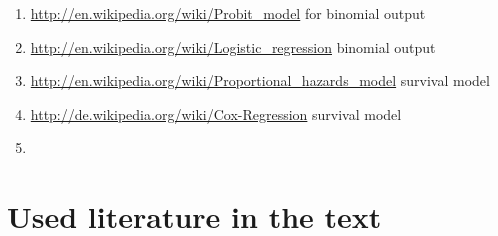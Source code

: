 \documentclass{article}
\begin{document}
\begin{enumerate}
		\begin{enumerate}
			\item \textcolor{black}{\url{http://en.wikipedia.org/wiki/Probit_model}} for binomial output
			\item \textcolor{black}{\url{http://en.wikipedia.org/wiki/Logistic_regression}}	binomial output
			\item \textcolor{black}{\url{http://en.wikipedia.org/wiki/Proportional_hazards_model}} survival model 
			\item \textcolor{black}{\url{http://de.wikipedia.org/wiki/Cox-Regression}} survival model
			\item \textcolor{black}{\url{}}
		\end{enumerate}
\end{enumerate}
\section*{Used literature in the text}
\end{document}
